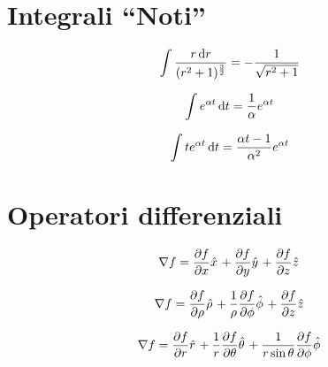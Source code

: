 \documentclass[a4paper,10pt]{article}
\begin{document}
\begin{multicols}{2}


\section{Integrali ``Noti''}
\begin{equation*}
  \int \frac{r \,\mathrm d r}{(r^2+1)^{\frac{3}{2}}} = - \frac{1}{\sqrt{r^2 + 1}}
\end{equation*}

\begin{equation*}
  \int e^{\alpha t} \,\mathrm d t = \frac{1}{\alpha} e^{\alpha t}
\end{equation*}

\begin{equation*}
  \int t e^{\alpha t} \,\mathrm d t = \frac{\alpha t - 1}{\alpha^2} e^{\alpha t}
\end{equation*}

\section{Operatori differenziali}

  \begin{equation*}
    \grad f = \dep{f}{x} \hat{x} +
    \dep{f}{y} \hat{y} +
    \dep{f}{z} \hat{z}
  \end{equation*}
  
  \begin{equation*}
    \grad f = \dep{f}{\rho} \hat{\rho} +
    \frac{1}{\rho} \dep{f}{\phi} \hat{\phi} +
    \dep{f}{z} \hat{z}
  \end{equation*}
  
  \begin{equation*}
    \grad f = \dep{f}{r} \hat{r} +
    \frac{1}{r} \dep{f}{\theta} \hat{\theta} +
    \frac{1}{r \sin \theta} \dep{f}{\phi} \hat{\phi}
  \end{equation*}
  

\end{multicols}
\end{document}
